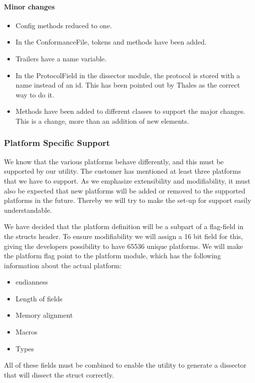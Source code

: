 \paragraph{Minor changes}
\begin{itemize}
\item Config methods reduced to one.
\item In the ConformanceFile, tokens and methods have been added.
\item Trailers have a name variable.
\item In the ProtocolField in the \gls{dissector} module, the \gls{protocol} is stored with a name instead of an id. This has been pointed out by Thales as the correct way to do it.
\item Methods have been added to different classes to support the major changes. This is a change, more than an addition of new elements. 
\end{itemize}

\subsubsection{Platform Specific Support}
We know that the various platforms behave differently, and this must be supported by our \gls{utility}. The customer has mentioned at least three platforms that we have to support. As we emphasize extensibility and modifiability, it must also be expected that new platforms will be added or removed to the supported platforms in the future. Thereby we will try to make the set-up for support easily understandable.

We have decided that the platform definition will be a subpart of a flag-field in the \glspl{struct} \gls{header}. To ensure modifiability we will assign a 16 bit field for this, giving the developers possibility to have 65536 unique platforms. We will make the platform flag point to the platform module, which has the following information about the actual platform:
\begin{itemize}
\item \Gls{endianness}
\item Length of fields
\item Memory alignment
\item Macros
\item Types
\end{itemize}
All of these fields must be combined to enable the \gls{utility} to generate a \gls{dissector} that will dissect the \gls{struct} correctly.

